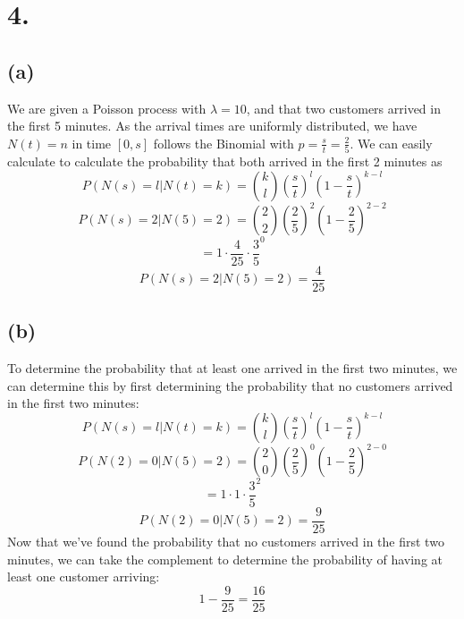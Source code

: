 \documentclass{article}
\begin{document}
{\Large 

\section*{4.}

\subsection*{(a)} 

We are given a Poisson process with \(\lambda = 10\), and that two customers arrived in the first 5 minutes. As the arrival times are uniformly distributed, we have \(N(t) = n \) in time \([0, s]\) follows the Binomial with \(p = \frac{s}{t} = \frac{2}{5}\). We can easily calculate to calculate the probability that both arrived in the first 2 minutes as 
\[
  P(N(s) = l | N(t) = k) = \binom{k}{l}(\frac{s}{t})^l(1 - \frac{s}{t})^{k-l}
\]
\[
  P(N(s) = 2 | N(5) = 2) = \binom{2}{2}(\frac{2}{5})^2(1 - \frac{2}{5})^{2-2}
\]
\[
  = 1 \cdot \frac{4}{25} \cdot \frac{3}{5}^0
\]
\[
  P(N(s) = 2 | N(5) = 2) = \boxed{\frac{4}{25}}
\]

\subsection*{(b)}

To determine the probability that at least one arrived in the first two minutes, we can determine this by first determining the probability that no customers arrived in the first two minutes:
\[
  P(N(s) = l | N(t) = k) = \binom{k}{l}(\frac{s}{t})^l(1 - \frac{s}{t})^{k-l}
\]
\[
  P(N(2) = 0 | N(5) = 2) = \binom{2}{0}(\frac{2}{5})^0(1 - \frac{2}{5})^{2-0}
\]
\[
  = 1 \cdot 1 \cdot \frac{3}{5}^2
\]
\[
  P(N(2) = 0 | N(5) = 2) = \frac{9}{25}
\]
Now that we've found the probability that no customers arrived in the first two minutes, we can take the complement to determine the probability of having at least one customer arriving:
\[
  1 - \frac{9}{25} = \boxed{\frac{16}{25}}
\]

}
\end{document}

